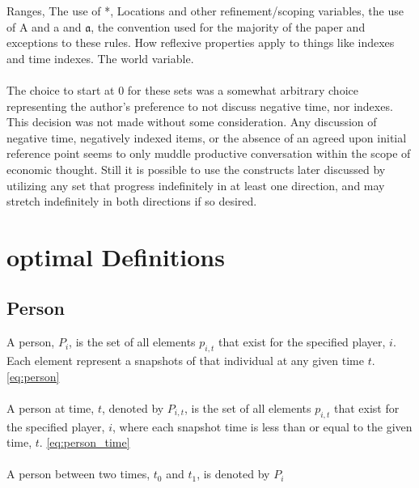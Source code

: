 \documentclass[]{article}
\begin{document}
%
Ranges, The use of *, Locations and other refinement/scoping variables, the use of A and a and $\mathfrak{a}$, the convention used for the majority of the paper and exceptions to these rules. How reflexive properties apply to things like indexes and time indexes. The world variable. 
\\
\\
The choice to start at $0$ for these sets was a somewhat arbitrary choice representing the author's preference to not discuss negative time, nor indexes. This decision was not made without some consideration. Any discussion of negative time, negatively indexed items, or the absence of an agreed upon initial reference point seems to only muddle productive conversation within the scope of economic thought. Still it is possible to use the constructs later discussed by utilizing any set that progress indefinitely in at least one direction, and may stretch indefinitely in both directions if so desired. 
%


\section*{optimal Definitions}
\subsection*{Person}
A person, $P_{i}$, is the set of all elements $p_{i,t}$ that exist for the specified player, $i$. Each element represent a snapshots of that individual at any given time $t$. \eqref{eq:person}
\\
\\
A person at time, $t$, denoted by $P_{i,t}$, is the set of all elements $p_{i,t}$ that exist for the specified player, $i$, where each snapshot time is less than or equal to the given time, $t$. \eqref{eq:person_time}
\\
\\
A person between two times, $t_{0}$ and $t_{1}$, is denoted by $P_{i}$
%

%
\end{document}
